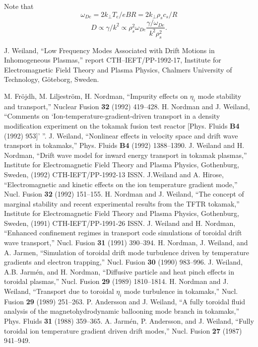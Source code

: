 Note that
$$ \omega_{De} = 2 k_\perp T_e / e B R = 2 k_\perp \rho_s c_s / R $$
$$ D \propto \gamma / k^2
  \propto \rho_s^2 \omega_{De}
    \frac{ \gamma / \omega_{De} }{ k^2 \rho_s^2 }. $$


\begin{thebibliography}{99}

 J. Weiland,
``Low Frequency Modes Associated with Drift Motions in
Inhomogeneous Plasmas,''
report CTH--IEFT/PP-1992-17,
Institute for Electromagnetic Field Theory and Plasma Physics,
Chalmers University of Technology,
G\"{o}teborg, Sweden.

 M. Fr\"{o}jdh, M. Liljestr\"{o}m, H. Nordman,
``Impurity effects on $\eta_i$ mode stability and transport,''
Nuclear Fusion {\bf 32} (1992) 419--428.
 H. Nordman and J. Weiland, ``Comments on
`Ion-temperature-gradient-driven 
transport in a density modification experiment on the tokamak fusion test
reactor [Phys. Fluids {\bf B4} (1992) 953]' ''.
 J. Weiland, 
``Nonlinear effects in velocity space and drift wave
transport in tokamaks,'' Phys. Fluids {\bf B4} (1992) 1388--1390.
 J. Weiland and H. Nordman, ``Drift wave model for inward
energy transport in tokamak plasmas,'' Institute for Electromagnetic Field
Theory and Plasma Physics, Gothenburg, Sweden, (1992) CTH-IEFT/PP-1992-13 ISSN.
 J.Weiland and A. Hirose, ``Electromagnetic and kinetic
effects on the ion temperature gradient mode,'' Nucl. Fusion {\bf 32} (1992)
151--155.
 H. Nordman and J. Weiland, ``The concept of marginal
stability and recent experimental results from the TFTR tokamak,'' Institute
for Electromagnetic Field Theory and Plasma Physics, Gothenburg, Sweden, (1991)
CTH-IEFT/PP-1991-26 ISSN.
 J. Weiland and H. Nordman, ``Enhanced confinement regimes in
transport code simulations of toroidal drift wave transport,'' Nucl. Fusion
{\bf 31} (1991) 390--394.
 H. Nordman, J. Weiland, and A. Jarmen, ``Simulation of
toroidal drift mode turbulence driven by temperature gradients and electron
trapping,'' Nucl. Fusion {\bf 30} (1990) 983--996.
 J. Weiland, A.B. Jarm\'{e}n, and H. Nordman, ``Diffusive
particle and heat pinch effects in toroidal plasmas,'' Nucl. Fusion {\bf 29}
(1989) 1810--1814.
 H. Nordman and J. Weiland, ``Transport due to toroidal
$\eta_i$ mode turbulence in tokamaks,'' Nucl. Fusion {\bf 29} (1989) 251--263.
 P. Andersson and J. Weiland, ``A fully toroidal fluid analysis
of the magnetohydrodynamic ballooning mode branch in tokamaks,'' Phys. Fluids
{\bf 31} (1988) 359--365.
 A. Jarm\'{e}n, P. Andersson, and J. Weiland, ``Fully toroidal
ion temperature gradient driven drift modes,'' Nucl. Fusion {\bf 27} (1987)
941--949.
\end{thebibliography}

